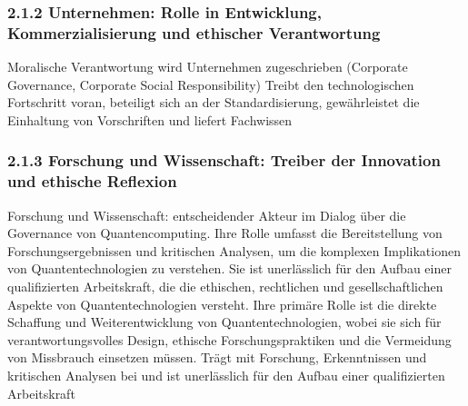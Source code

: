 \subsubsection{2.1.2 Unternehmen: Rolle in Entwicklung, Kommerzialisierung und ethischer Verantwortung}
Moralische Verantwortung wird Unternehmen zugeschrieben (Corporate Governance, Corporate Social Responsibility)
Treibt den technologischen Fortschritt voran, beteiligt sich an der Standardisierung, gewährleistet die Einhaltung von Vorschriften und liefert Fachwissen

\subsubsection{2.1.3 Forschung und Wissenschaft: Treiber der Innovation und ethische Reflexion}
Forschung und Wissenschaft: entscheidender Akteur im Dialog über die Governance von Quantencomputing. Ihre Rolle umfasst die Bereitstellung von Forschungsergebnissen und kritischen Analysen, um die komplexen Implikationen von Quantentechnologien zu verstehen. Sie ist unerlässlich für den Aufbau einer qualifizierten Arbeitskraft, die die ethischen, rechtlichen und gesellschaftlichen Aspekte von Quantentechnologien versteht. Ihre primäre Rolle ist die direkte Schaffung und Weiterentwicklung von Quantentechnologien, wobei sie sich für verantwortungsvolles Design, ethische Forschungspraktiken und die Vermeidung von Missbrauch einsetzen müssen.
Trägt mit Forschung, Erkenntnissen und kritischen Analysen bei und ist unerlässlich für den Aufbau einer qualifizierten Arbeitskraft

